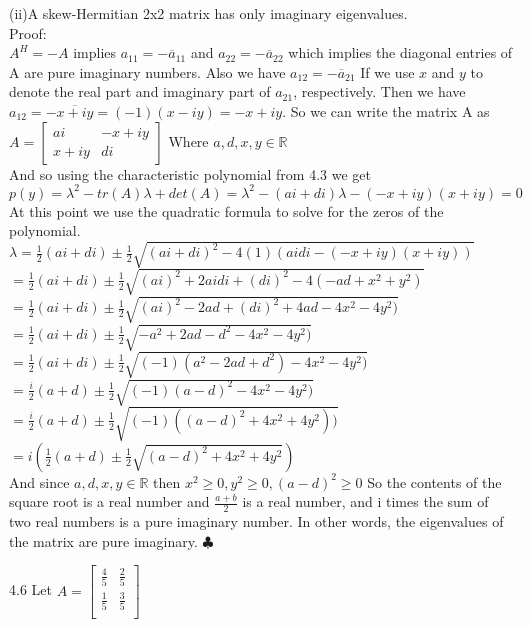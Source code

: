 \documentclass[12pt]{article}
\newenvironment{problems}{\begin{list}{}{\setlength{\labelwidth}{.7in}}}{\end{list}}
\begin{document}
\begin{problems}
 (ii)A skew-Hermitian 2x2 matrix has only imaginary eigenvalues.\\
 Proof:\\
 $A^H = -A$ implies $a_{11} = -\overline a_{11}$ and $a_{22} = -\overline a_{22}$ which implies the diagonal entries of A are pure imaginary numbers. Also we have $a_{12} = -\overline a_{21}$ If we use $x$ and $y$ to denote the real part and imaginary part of $a_{21}$, respectively. Then we have $a_{12} = -\overline{x+iy} = (-1)(x-iy) =-x+iy$. So we can write the matrix A as$ A = \begin{bmatrix}
    ai  &  -x+iy\\
   x+iy &  di 
 \end{bmatrix} $ Where $a,d,x,y\in \mathbb{R}$\\
 And so using the characteristic polynomial from 4.3 we get $p(y) = \lambda^2 -tr(A)\lambda +det(A) =
 \lambda^2 -(ai+di)\lambda - (-x+iy)(x+iy)= 0 $\\
 At this point we use the quadratic formula to solve for the zeros of the polynomial.\\
 $\lambda = \frac{1}{2}(ai+di) \pm \frac{1}{2}\sqrt{ (ai+di)^2 -4(1)(aidi - (-x+iy)(x+iy))     } $\\
$  = \frac{1}{2}(ai+di) \pm \frac{1}{2}\sqrt{ (ai)^2+2aidi + (di)^2 -4(-ad +x^2 + y^2)     }$\\
$  = \frac{1}{2}(ai+di) \pm \frac{1}{2}\sqrt{ (ai)^2-2ad + (di)^2 +4ad -4x^2  -4y^2)     }$\\
$  = \frac{1}{2}(ai+di) \pm \frac{1}{2}\sqrt{ -a^2 + 2ad  -d^2 -4x^2  -4y^2)     }$\\
$  = \frac{1}{2}(ai+di) \pm \frac{1}{2}\sqrt{ (-1)(a^2 - 2ad  +d^2) -4x^2  -4y^2)     }$\\
$  = \frac{i}{2}(a + d) \pm \frac{1}{2}\sqrt{ (-1)(a-d)^2 -4x^2  -4y^2)     }$\\
$ = \frac{i}{2}(a + d) \pm \frac{1}{2}\sqrt{ (-1)((a-d)^2 +4x^2  +4y^2))     }$\\
$ = i\left(\frac{1}{2}(a + d) \pm \frac{1}{2}\sqrt{ (a-d)^2 +4x^2  +4y^2    }\right)$\\
And since $a,d,x,y\in \mathbb{R}$ then $x^2 \geq 0, y^2 \geq 0, (a-d)^2 \geq 0$ So the contents of the square root is a real number and $\frac{a+b}{2}$ is a real number, and i times the sum of two real numbers is a pure imaginary number. In other words, the eigenvalues of the matrix are pure imaginary. \hfill $\clubsuit$\\

\item[4.6]
Let $A = 
\begin{bmatrix}
   \frac{4}{5} & \frac{2}{5} \\
   \frac{1}{5} & \frac{3}{5} \\
  \end{bmatrix} 
 $


\end{problems}
\end{document}
